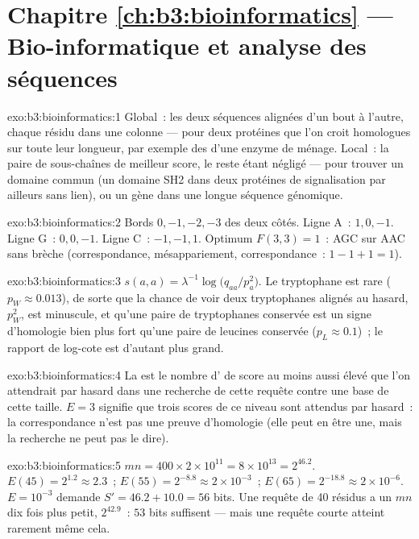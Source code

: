 \section*{Chapitre \ref{ch:b3:bioinformatics} --- Bio-informatique et analyse des séquences}

\begin{solution}{exo:b3:bioinformatics:1}
Global~: les deux séquences alignées d'un bout à l'autre, chaque résidu
dans une colonne --- pour deux protéines que l'on croit homologues sur
toute leur longueur, par exemple des  d'une enzyme de
ménage. Local~: la paire de sous-chaînes de meilleur score, le reste
étant négligé --- pour trouver un domaine commun (un domaine SH2 dans
deux protéines de signalisation par ailleurs sans lien), ou un gène dans
une longue séquence génomique.
\end{solution}

\begin{solution}{exo:b3:bioinformatics:2}
Bords $0,-1,-2,-3$ des deux côtés. Ligne A~: $1, 0, -1$. Ligne G~:
$0, 0, -1$. Ligne C~: $-1, -1, 1$. Optimum $F(3,3) = 1$~: AGC sur AAC
sans brèche (correspondance, mésappariement, correspondance~:
$1 - 1 + 1 = 1$).
\end{solution}

\begin{solution}{exo:b3:bioinformatics:3}
$s(a,a) = \lambda^{-1}\log\bigl(q_{aa}/p_{a}^{2}\bigr)$. Le tryptophane
est rare ($p_{W} \approx 0.013$), de sorte que la chance de voir deux
tryptophanes alignés au hasard, $p_{W}^{2}$, est minuscule, et qu'une
paire de tryptophanes conservée est un signe d'homologie bien plus fort
qu'une paire de leucines conservée ($p_{L}
\approx 0.1$)~; le rapport de log-cote est d'autant plus grand.
\end{solution}

\begin{solution}{exo:b3:bioinformatics:4}
La  est le nombre d' de score au moins aussi élevé
que l'on attendrait par hasard dans une recherche de cette requête
contre une base de cette taille. $E = 3$ signifie que trois scores de
ce niveau sont attendus par hasard~: la correspondance n'est pas une
preuve d'homologie (elle peut en être une, mais la recherche ne peut
pas le dire).
\end{solution}

\begin{solution}{exo:b3:bioinformatics:5}
$mn = 400\times 2\times 10^{11} = 8\times 10^{13} = 2^{46.2}$. $E(45) =
2^{1.2} \approx 2.3$~; $E(55) = 2^{-8.8} \approx 2\times 10^{-3}$~;
$E(65) = 2^{-18.8} \approx 2\times 10^{-6}$. $E = 10^{-3}$ demande $S' =
46.2 + 10.0 = 56$ bits. Une requête de \num{40} résidus a un $mn$ dix
fois plus petit, $2^{42.9}$~: $53$ bits suffisent --- mais une requête
courte atteint rarement même cela.
\end{solution}

